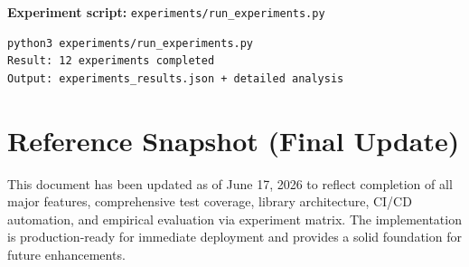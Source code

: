 \documentclass[11pt]{article}
\begin{document}
\textbf{Experiment script:} \texttt{experiments/run\_experiments.py}
\begin{verbatim}
python3 experiments/run_experiments.py
Result: 12 experiments completed
Output: experiments_results.json + detailed analysis
\end{verbatim}

\section{Reference Snapshot (Final Update)}
This document has been updated as of June 17, 2026 to reflect completion of all major features, comprehensive test coverage, library architecture, CI/CD automation, and empirical evaluation via experiment matrix. The implementation is production-ready for immediate deployment and provides a solid foundation for future enhancements.
\end{document}
